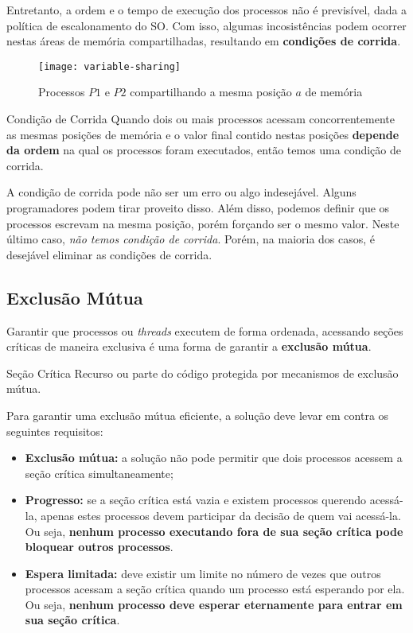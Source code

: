 Entretanto, a ordem e o tempo de execução dos processos não é previsível, dada a política de escalonamento do SO. Com isso, algumas incosistências podem ocorrer nestas áreas de memória compartilhadas, resultando em \textbf{condições de corrida}.

\begin{figure}
  \centering
  \texttt{[image: variable-sharing]}
  \caption{Processos $P1$ e $P2$ compartilhando a mesma posição $a$ de memória}
  \label{fig:variable-sharing}
\end{figure}

\begin{definicao}{Condição de Corrida}
  Quando dois ou mais processos acessam concorrentemente as mesmas posições de memória e o valor final contido nestas posições \textbf{depende da ordem} na qual os processos foram executados, então temos uma condição de corrida.
\end{definicao}

A condição de corrida pode não ser um erro ou algo indesejável. Alguns programadores podem tirar proveito disso. Além disso, podemos definir que os processos escrevam na mesma posição, porém forçando ser o mesmo valor. Neste último caso, \textit{não temos condição de corrida}. Porém, na maioria dos casos, é desejável eliminar as condições de corrida.





\subsection{Exclusão Mútua}
Garantir que processos ou \textit{threads} executem de forma ordenada, acessando seções críticas de maneira exclusiva é uma forma de garantir a \textbf{exclusão mútua}.

\begin{definicao}{Seção Crítica}
  Recurso ou parte do código protegida por mecanismos de exclusão mútua.
\end{definicao}

Para garantir uma exclusão mútua eficiente, a solução deve levar em contra os seguintes requisitos:
\begin{itemize}
  \item \textbf{Exclusão mútua:} a solução não pode permitir que dois processos acessem a seção crítica simultaneamente;

  \item \textbf{Progresso:} se a seção crítica está vazia e existem processos querendo acessá-la, apenas estes processos devem participar da decisão de quem vai acessá-la. Ou seja, \textbf{nenhum processo executando fora de sua seção crítica pode bloquear outros processos}.

  \item \textbf{Espera limitada:} deve existir um limite no número de vezes que outros processos acessam a seção crítica quando um processo está esperando por ela. Ou seja, \textbf{nenhum processo deve esperar eternamente para entrar em sua seção crítica}.
\end{itemize}

